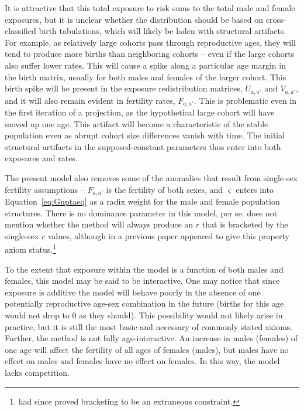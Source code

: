  It is attractive that this total exposure to
 risk sums to the total male and female exposures, but it is unclear whether the
 distribution should be based on cross-classified birth tabulations, which will
 likely be laden with structural artifacts. For example, as relatively large
 cohorts pass through reproductive ages, they will tend to produce more births
 than neighboring cohorts -- even if the large cohorts also suffer lower rates.
 This will cause a spike along a particular age margin in the birth matrix,
 usually for both males and females of the larger cohort. This birth spike will
 be present in the exposure redistribution matrices, $U_{a,a'}$ and
 $V_{a,a'}$, and it will also remain evident in fertility rates, $F_{a,a'}$.
 This is problematic even in the first iteration of a projection, as the
 hypothetical large cohort will have moved up one age. This artifact will
become a characteristic of the stable population even as abrupt cohort size
differences vanish with time. The initial structural artifacts in the 
supposed-constant parameters thus enter into both exposures and rates. 

The present model also removes some of the anomalies that
result from single-sex fertility assumptions -- $F_{a,a'}$ is the fertility of
both sexes, and $\varsigma$ enters into Equation~\eqref{eq:Guptaeq} as a radix
weight for the male and female population structures. There is no dominance
parameter in this model, per se. \citet{gupta1978alternative} does not mention
whether the method will always produce an $r$ that is bracketed by the
single-sex $r$ values, although in a previous paper
\citet{gupta1976interactive} appeared to give this property axiom
status.\footnote{\citet{yellin1977comparison} had since proved bracketing to be
an extraneous constraint.}
 
 To the extent that exposure within the model is a function of both males and
 females, this model may be said to be interactive. One may notice that since
 exposure is additive the model will behave poorly in the absence of one
 potentially reproductive age-sex combination in the future (births for this
 age would not drop to 0 as they should). This possibility would not likely
 arise in practice, but it is still the most basic and necessary of
 commonly stated axioms. Further, the method is not fully age-interactive. An
 increase in males (females) of one age will affect the fertility of all ages of
 females (males), but males have no effect on males and females have no effect
 on females. In this way, the model lacks competition.

